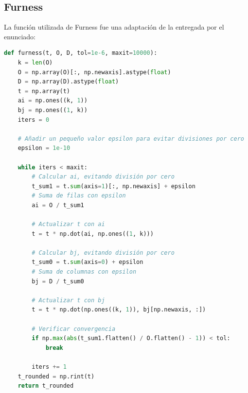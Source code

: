 \documentclass[12pt]{article} %
\begin{document}
\newpage
\subsection{Furness}

La función utilizada de Furness fue una adaptación de la entregada por el enunciado:

\begin{lstlisting}[language=Python]
  def furness(t, O, D, tol=1e-6, maxit=10000):
    k = len(O)
    O = np.array(O)[:, np.newaxis].astype(float)
    D = np.array(D).astype(float)
    t = np.array(t)
    ai = np.ones((k, 1))
    bj = np.ones((1, k))
    iters = 0
    
    # Añadir un pequeño valor epsilon para evitar divisiones por cero
    epsilon = 1e-10

    while iters < maxit:
        # Calcular ai, evitando división por cero
        t_sum1 = t.sum(axis=1)[:, np.newaxis] + epsilon  
        # Suma de filas con epsilon
        ai = O / t_sum1
        
        # Actualizar t con ai
        t = t * np.dot(ai, np.ones((1, k)))
        
        # Calcular bj, evitando división por cero
        t_sum0 = t.sum(axis=0) + epsilon  
        # Suma de columnas con epsilon
        bj = D / t_sum0
        
        # Actualizar t con bj
        t = t * np.dot(np.ones((k, 1)), bj[np.newaxis, :])
        
        # Verificar convergencia
        if np.max(abs(t_sum1.flatten() / O.flatten() - 1)) < tol:
            break

        iters += 1
    t_rounded = np.rint(t)
    return t_rounded
\end{lstlisting}

\end{document}
